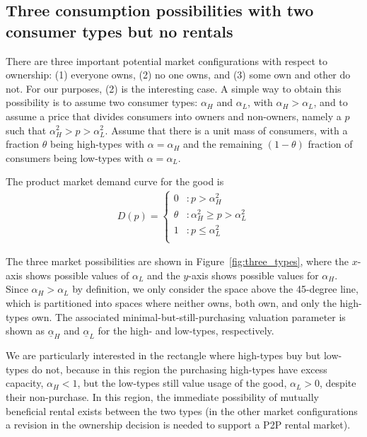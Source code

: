 \documentclass[11pt]{article}
\begin{document}
\subsection{Three consumption possibilities with two consumer types but no rentals} 
There are three important potential market configurations with respect to ownership:
(1) everyone owns, (2) no one owns, and (3) some own and other do not.
For our purposes, (2) is the interesting case.
A simple way to obtain this possibility is to assume two consumer
types: $\alpha_H$ and $\alpha_L$, with $\alpha_H > \alpha_L$, and to assume a price that divides consumers into owners and non-owners, namely a $p$ such that $\alpha_H^2 > p > \alpha_L^2$.
Assume that there is a unit mass of consumers, with a fraction $\theta$ being high-types with $\alpha = \alpha_H$ and the remaining $(1-\theta)$ fraction of consumers being low-types with $\alpha = \alpha_L$. 

The product market demand curve for the good is 
\begin{align} \label{eq:demand}
   D(p) = \left\{
     \begin{array}{ll}
       0 & : p > \alpha_H^2\\
       \theta & : \alpha_H^2 \ge p > \alpha_L^2  \\
       1 & : p \le \alpha_L^2  \\
     \end{array}
   \right. 
\end{align} 

The three market possibilities are shown in Figure~\ref{fig:three_types}, where the $x$-axis shows possible values of $\alpha_L$ and the $y$-axis shows possible values for $\alpha_H$. 
Since $\alpha_H > \alpha_L$ by definition, we only consider the space above the 45-degree line, which is partitioned into spaces where neither owns, both own, and only the high-types own. 
The associated minimal-but-still-purchasing valuation parameter is shown as $\underline{\alpha}_H$ and $\underline{\alpha}_L$ for the high- and low-types, respectively. 

We are particularly interested in the rectangle where high-types buy but low-types do not, because in this region the purchasing high-types have excess capacity, $\alpha_H < 1$, but the low-types still value usage of the good, $\alpha_L > 0$, despite their non-purchase. 
In this region, the immediate possibility of mutually beneficial rental exists between the two types (in the other market configurations a revision in the ownership decision is needed to support a P2P rental market). 
\end{document}
